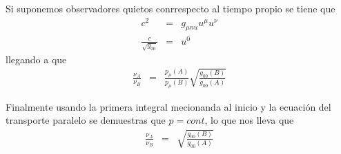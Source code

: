 \documentclass[xcolor=dvipsnames]{beamer}
\begin{document}
 
    \begin{frame}{}
    \begin{block}{}
        Si suponemos observadores quietos conrrespecto al tiempo propio  se tiene que 
        \begin{eqnarray*}
    c^{2}&=& g_{\mu nu} u^{\mu}u^{\nu} \\     
            \frac{c}{\sqrt{g_{00}}}&=&u^{0}
        \end{eqnarray*}
    llegando a que
      \begin{eqnarray*}
         \frac{\nu_{A}}{\nu_{B}} &=&\frac{p_{\mu}(A)}{p_{\mu}(B)}  \sqrt{\frac{g_{00}(B)}{g_{00}(A)}}
    \end{eqnarray*}
    \end{block}
    \end{frame}



    \begin{frame}{}
    \begin{block}{}
     Finalmente usando la primera integral mecionanda al inicio y la ecuación del transporte paralelo se demuestras que $p=cont$, lo que nos lleva que
      \begin{eqnarray*}
         \frac{\nu_{A}}{\nu_{B}} &=&  \sqrt{\frac{g_{00}(B)}{g_{00}(A)}}
    \end{eqnarray*}
    \end{block}
    \end{frame}
\end{document}
